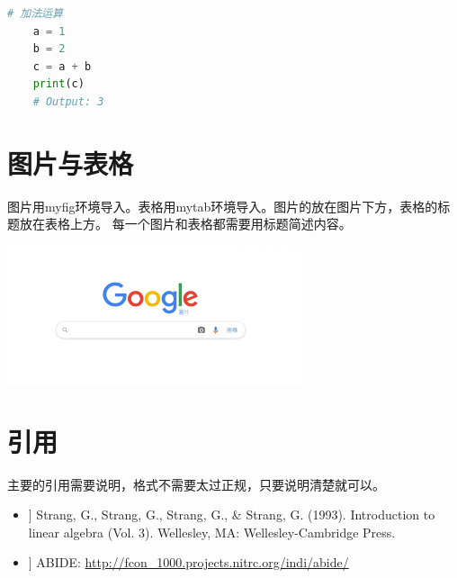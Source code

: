\documentclass[a4paper,9pt]{extarticle}
\begin{document}
\begin{multicols*}{2}
\begin{lstlisting}[language=Python]
    # 加法运算
    a = 1
    b = 2
    c = a + b
    print(c)
    # Output: 3
    \end{lstlisting}
    
\section{图片与表格}
    图片用myfig环境导入。表格用mytab环境导入。图片的放在图片下方，表格的标题放在表格上方。
    每一个图片和表格都需要用标题简述内容。
	
\begin{myfig}[!htb]
  \centering
  \includegraphics[width=\linewidth]{images.png}
\end{myfig}
 
\begin{mytab}[!htb]
\end{mytab}


 
\section*{引用}
    主要的引用需要说明，格式不需要太过正规，只要说明清楚就可以。
    \begin{itemize}
        \item [[1]] Strang, G., Strang, G., Strang, G., \& Strang, G. (1993). Introduction to linear algebra (Vol. 3). Wellesley, MA: Wellesley-Cambridge Press.
        
        \item [[2]] ABIDE: \url{http://fcon_1000.projects.nitrc.org/indi/abide/}
    \end{itemize}

\end{multicols*}
\end{document}
